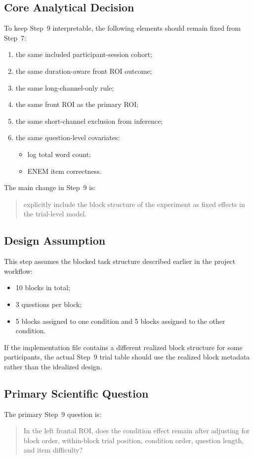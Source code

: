 \subsection{Core Analytical Decision}
To keep Step~9 interpretable, the following elements should remain fixed from Step~7:
\begin{enumerate}
    \item the same included participant-session cohort;
    \item the same duration-aware front ROI outcome;
    \item the same long-channel-only rule;
    \item the same front ROI as the primary ROI;
    \item the same short-channel exclusion from inference;
    \item the same question-level covariates:
    \begin{itemize}
        \item log total word count;
        \item ENEM item correctness.
    \end{itemize}
\end{enumerate}

The main change in Step~9 is:
\begin{quote}
explicitly include the block structure of the experiment as fixed effects in the trial-level model.
\end{quote}

\subsection{Design Assumption}
This step assumes the blocked task structure described earlier in the project workflow:
\begin{itemize}
    \item 10 blocks in total;
    \item 3 questions per block;
    \item 5 blocks assigned to one condition and 5 blocks assigned to the other condition.
\end{itemize}

If the implementation file contains a different realized block structure for some participants,
the actual Step~9 trial table should use the realized block metadata rather than the idealized design.

\subsection{Primary Scientific Question}
The primary Step~9 question is:
\begin{quote}
In the left frontal ROI, does the condition effect remain after adjusting for block order,
within-block trial position, condition order, question length, and item difficulty?
\end{quote}

